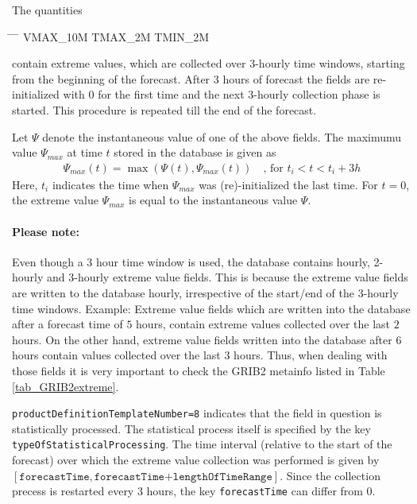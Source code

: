 The quantities
\begin{note}
\begin{tabbing}
  \hspace{0.2\textwidth} \= \hspace{0.2\textwidth} \= \hspace{0.2\textwidth} \= \hspace{0.2\textwidth} \kill
  VMAX\_10M \>
  TMAX\_2M \>
  TMIN\_2M 
\end{tabbing}
\end{note}
contain extreme values, which are collected over $3$-hourly time windows, starting from the beginning of the forecast. 
After $3$ hours of forecast the fields are re-initialized with $0$ for the first time and the next $3$-hourly collection 
phase is started. This procedure is repeated till the end of the forecast.

Let $\Psi$ denote the instantaneous value of one of the above fields. The maximumu value $\Psi_{max}$ at time $t$ stored in the 
database is given as
\begin{align}
 \Psi_{max}(t) = \max(\Psi(t),\Psi_{max}(t))  \quad \text{, for } t_{i}<t<t_{i}+3h
\end{align}
Here, $t_{i}$ indicates the time when $\Psi_{max}$ was (re)-initialized the last time. For $t=0$, the extreme value $\Psi_{max}$ 
is equal to the instantaneous value $\Psi$. 

\paragraph{Please note:} Even though a 3 hour time window is used, the database contains hourly, 2-hourly and 3-hourly 
extreme value fields. This is because the extreme value fields are written to the database hourly, irrespective of the 
start/end of the 3-hourly time windows. Example: Extreme value fields which are written into the database after a 
forecast time of $5$ hours, contain extreme values collected over the last $2$ hours. On the other hand, extreme value fields 
written into the database after $6$ hours contain values collected over the last $3$ hours.
Thus, when dealing with those fields it is very important to check the GRIB2 metainfo listed in Table \ref{tab_GRIB2extreme}.

\texttt{productDefinitionTemplateNumber=8} indicates that the field in question is statistically processed. The statistical process itself 
is specified by the key \texttt{typeOfStatisticalProcessing}. The time interval (relative to the start of the forecast) over which the 
extreme value collection was performed is given by $[\texttt{forecastTime},\texttt{forecastTime+lengthOfTimeRange}]$. 
Since the collection precess is restarted every $3$ hours, the key \texttt{forecastTime} can differ from 0. 

